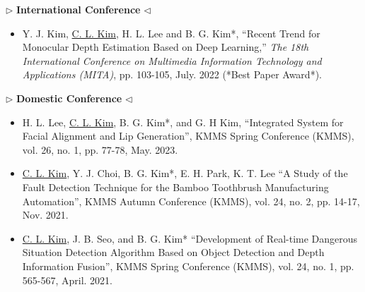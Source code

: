 \vspace*{0.5cm}
\begin{center}
$\triangleright$ \large{\bf{International Conference}}
$\triangleleft$
\end{center}
\begin{itemize}
\normalsize
\item Y. J. Kim, \underline{C. L. Kim}, H. L. Lee and B. G. Kim*, “Recent Trend for Monocular Depth Estimation Based on Deep Learning,” \textit{The 18th International Conference on Multimedia Information Technology and Applications (MITA)}, pp. 103-105, July. 2022 (*Best Paper Award*).
\end{itemize}


\vspace*{0.5cm}
\begin{center}
$\triangleright$ \large{\bf{Domestic Conference}}
$\triangleleft$
\end{center}
\begin{itemize}
\item H. L. Lee, \underline{C. L. Kim}, B. G. Kim*, and G. H Kim, “Integrated System for Facial Alignment and Lip Generation”, KMMS Spring Conference (KMMS), vol. 26, no. 1, pp. 77-78, May. 2023.
\end{itemize}

\begin{itemize}
\item \underline{C. L. Kim}, Y. J. Choi, B. G. Kim*, E. H. Park, K. T. Lee “A Study of the Fault Detection Technique for the Bamboo Toothbrush Manufacturing Automation”, KMMS Autumn Conference (KMMS), vol. 24, no. 2, pp. 14-17, Nov. 2021.
\end{itemize}



\begin{itemize}
\item \underline{C. L. Kim}, J. B. Seo, and B. G. Kim* “Development of Real-time Dangerous Situation Detection Algorithm Based on Object Detection and Depth Information Fusion”, KMMS Spring Conference (KMMS), vol. 24, no. 1, pp. 565-567, April. 2021.
\end{itemize}



